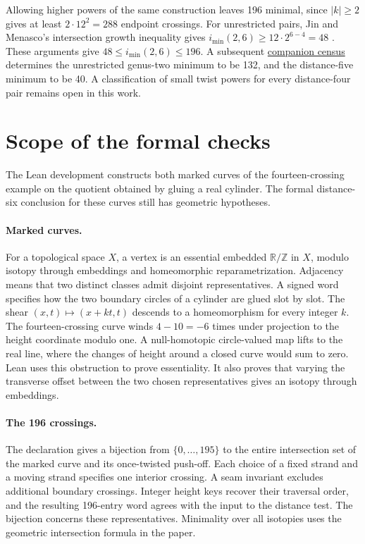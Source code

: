 \documentclass[11pt,a4paper]{article}
\newcommand{\ttcode}[1]{\texttt{\detokenize{#1}}}
\begin{document}
Allowing higher powers of the same construction leaves 196 minimal,
since \(|k|\ge2\) gives at least \(2\cdot12^2=288\) endpoint crossings.
For unrestricted pairs, Jin and Menasco's intersection growth inequality
gives \(i_{\min}(2,6)\ge 12\cdot2^{6-4}=48\) \cite[Theorem~1.3]{JM}.
These arguments give \(48\le i_{\min}(2,6)\le196\).
A subsequent \href{https://github.com/LiquidGunay/short-twists-curve-graph/blob/main/paper/minimum-six.pdf}{companion census}
determines the unrestricted genus-two minimum to be 132, and the
distance-five minimum to be 40. A classification of small twist powers
for every distance-four pair remains open in this work.

\clearpage
\section{Scope of the formal checks}
The Lean development constructs both marked curves of the fourteen-crossing
example on the quotient obtained by gluing a real cylinder. The formal
distance-six conclusion for these curves still has geometric hypotheses.

\paragraph{Marked curves.}
For a topological space \(X\), a vertex is an essential embedded
\(\mathbb R/\mathbb Z\) in \(X\), modulo isotopy through embeddings and
homeomorphic reparametrization. Adjacency means that two distinct classes
admit disjoint representatives. A signed word specifies how the two boundary
circles of a cylinder are glued slot by slot. The shear
\((x,t)\mapsto(x+kt,t)\) descends to a homeomorphism for every integer \(k\).
The fourteen-crossing curve winds \(4-10=-6\) times under projection to
the height coordinate modulo one. A null-homotopic circle-valued map lifts
to the real line, where the changes of height around a closed curve would
sum to zero. Lean uses this obstruction to prove essentiality. It also proves
that varying the transverse offset between the two chosen representatives
gives an isotopy through embeddings.

\paragraph{The 196 crossings.}
The declaration \ttcode{actualCrossings} gives a bijection from
\(\{0,\ldots,195\}\) to the entire intersection set of the marked curve
and its once-twisted push-off. Each choice of a fixed strand and a moving
strand specifies one interior crossing. A seam invariant excludes additional
boundary crossings. Integer height keys recover their traversal order, and the
resulting 196-entry word agrees with the input to the distance test. The
bijection concerns these representatives. Minimality over all isotopies
uses the geometric intersection formula in the paper.
\end{document}
